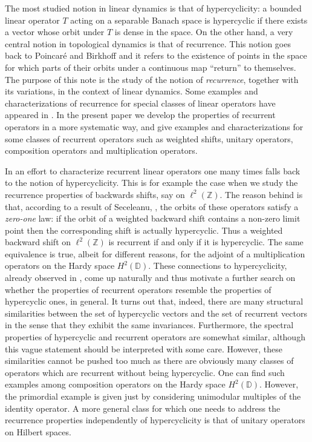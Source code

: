 \documentclass[12pt,leqno]{amsart}
\theoremstyle{plain}
\theoremstyle{definition}
\numberwithin{equation}{section}
\begin{document}
The most studied notion in linear dynamics is that of hypercyclicity: a bounded linear operator $T$ acting on a separable Banach space is hypercyclic if there exists a vector whose orbit under $T$ is dense in the space. On the other hand, a very central notion in topological dynamics is that of recurrence. This notion goes back to Poincar\'e and Birkhoff and it refers to the existence of points in the space for which parts of their orbits under a continuous map ``return'' to themselves. The purpose of this note is the study of the notion of \emph{recurrence}, together with its variations, in the context of linear dynamics. Some examples and characterizations of recurrence for special classes of linear operators have appeared in \cite{CP}. In the present paper we develop the properties of recurrent operators in a more systematic way, and give examples and characterizations for some classes of recurrent operators such as weighted shifts, unitary operators, composition operators and multiplication operators. 

In an effort to characterize recurrent linear operators one many times falls back to the notion of hypercyclicity. This is for example the case when we study the recurrence properties of backwards shifts, say on $\ell^2(\mathbb Z)$. The reason behind is that, according to a result of Seceleanu, \cite{Sece:thesis}, the orbits of these operators satisfy a \emph{zero-one} law: if the orbit of a weighted backward shift contains a non-zero limit point then the corresponding shift is actually hypercyclic. Thus a weighted backward shift on $\ell^2(\mathbb Z)$ is recurrent if and only if it is hypercyclic. The same equivalence is true, albeit for different reasons, for the adjoint of a multiplication operators on the Hardy space $H^2(\mathbb D)$. These connections to hypercyclicity, already observed in \cite{CP}, come up naturally and thus motivate a further search on whether the properties of recurrent operators resemble the properties of hypercyclic ones, in general. It turns out that, indeed, there are many structural similarities between the set of hypercyclic vectors and the set of recurrent vectors in the sense that they exhibit the same invariances. Furthermore, the spectral properties of hypercyclic and recurrent operators are somewhat similar, although this vague statement should be interpreted with some care. However, these similarities cannot be pushed too much as there are obviously many classes of operators which are recurrent without being hypercyclic. One can find such examples among composition operators on the Hardy space $H^2(\mathbb D)$. However, the primordial example is given just by considering unimodular multiples of the identity operator. A more general class for which one needs to address the recurrence properties independently of hypercyclicity is that of unitary operators on Hilbert spaces. 
\end{document}
